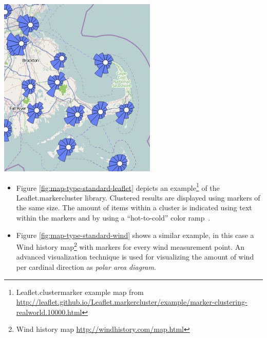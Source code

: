 \begin{itemize}
{    \includegraphics [width=\linewidth]{figures/map_types_standard_wind.png}
    \label{fig:map-type-standard-wind}
}

\begin{itemize}

\item Figure \ref{fig:map-type-standard-leaflet} depicts an example\footnote{Leaflet.clustermarker example map from \url{http://leaflet.github.io/Leaflet.markercluster/example/marker-clustering-realworld.10000.html}} of the Leaflet.markercluster library. Clustered results are displayed using markers of the same size. The amount of items within a cluster is indicated using text within the markers and by using a ``hot-to-cold'' color ramp~\cite{web:color-ramp}. 

\item Figure \ref{fig:map-type-standard-wind} shows a similar example, in this case a Wind history map\footnote{Wind history map \url{http://windhistory.com/map.html}} with markers for every wind measurement point. An advanced visualization technique is used for visualizing the amount of wind per cardinal direction as \textit{polar area diagram}.


\end{itemize}
\end{itemize}
